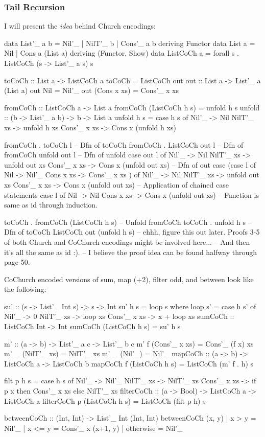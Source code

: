 
\subsubsection{Tail Recursion}\label{sec:tail}
I will present the \textit{idea} behind Church encodings:
\begin{code}
data List'_ a b = Nil'_ | NilT'_ b | Cons'_ a b deriving Functor
data List a = Nil | Cons a (List a) deriving (Functor, Show)
data ListCoCh a = forall s . ListCoCh (s -> List'_ a s) s

toCoCh :: List a -> ListCoCh a
toCoCh = ListCoCh out
out :: List a -> List'_ a (List a)
out Nil = Nil'_
out (Cons x xs) = Cons'_ x xs

fromCoCh :: ListCoCh a -> List a
fromCoCh (ListCoCh h s) = unfold h s
unfold :: (b -> List'_ a b) -> b -> List a
unfold h s = case h s of
  Nil'_ -> Nil
  NilT'_ xs -> unfold h xs
  Cons'_ x xs -> Cons x (unfold h xs)


fromCoCh . toCoCh l
-- Dfn of toCoCh
fromCoCh . ListCoCh out l
-- Dfn of fromCoCh
unfold out l
-- Dfn of unfold
case out l of
  Nil'_ -> Nil
  NilT'_ xs -> unfold out xs
  Cons'_ x xs -> Cons x (unfold out xs)
-- Dfn of out
case (case l of
  Nil -> Nil'_
  Cons x xs -> Cons'_ x xs
  ) of
  Nil'_ -> Nil
  NilT'_ xs -> unfold out xs
  Cons'_ x xs -> Cons x (unfold out xs)
-- Application of chained case statements
case l of
  Nil -> Nil
  Cons x xs -> Cons x (unfold out xs)
-- Function is same as id through induction.


toCoCh . fromCoCh (ListCoCh h s)
-- Unfold fromCoCh
toCoCh . unfold h s
-- Dfn of toCoCh
ListCoCh out (unfold h s)
-- ehhh, figure this out later. Proofs 3-5 of both Church and CoChurch encodings might be involved here...
-- And then it's all the same as id :).
-- I believe the proof idea can be found halfway through page 50.
\end{code}
CoChurch encoded versions of sum, map (+2), filter odd, and between look like the following:
\begin{code}
su' :: (s -> List'_ Int s) -> s -> Int
su' h s = loop s
  where loop s' = case h s' of
    Nil'_ -> 0
    NilT'_ xs -> loop xs
    Cons'_ x xs -> x + loop xs
sumCoCh :: ListCoCh Int -> Int
sumCoCh (ListCoCh h s) = su' h s

m' :: (a -> b) -> List'_ a c -> List'_ b c
m' f (Cons'_ x xs) = Cons'_ (f x) xs
m' _ (NilT'_ xs) = NilT'_ xs
m' _ (Nil'_) = Nil'_
mapCoCh :: (a -> b) -> ListCoCh a -> ListCoCh b
mapCoCh f (ListCoCh h s) = ListCoCh (m' f . h) s

filt p h s = case h s of
               Nil'_ -> Nil'_
               NilT'_ xs -> NilT'_ xs
               Cons'_ x xs -> if p x then Cons'_ x xs else NilT'_ xs
filterCoCh :: (a -> Bool) -> ListCoCh a -> ListCoCh a
filterCoCh p (ListCoCh h s) = ListCoCh (filt p h) s

betweenCoCh :: (Int, Int) -> List'_ Int (Int, Int)
betweenCoCh (x, y)
  | x > y = Nil'_
  | x <= y = Cons'_ x (x+1, y)
  | otherwise = Nil'_
\end{code}
